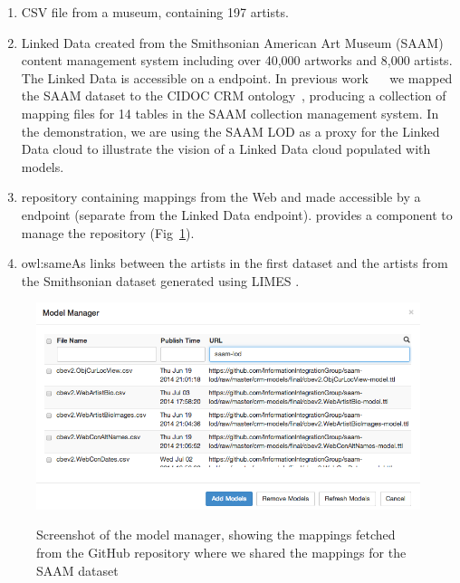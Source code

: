 \begin{enumerate}
\item CSV file from a museum, containing 197 artists. %
\item Linked Data created from the Smithsonian American Art Museum (SAAM) content management system including over 40,000 artworks and 8,000 artists. 
The Linked Data is accessible on a \sparql endpoint.
In previous work~\cite{Szekely:2013vq} ~ we mapped the SAAM dataset to the CIDOC CRM ontology~\cite{Doerr:2003:CCR:958671.958678}, producing a collection of \rtworml mapping files for 14 tables in the SAAM collection management system.
In the demonstration, we are using the SAAM LOD as a proxy for the Linked Data cloud to illustrate the vision of a Linked Data cloud populated with \rtworml models.
\item \rtworml repository containing \rtworml mappings from the Web and made accessible by a \sparql endpoint (separate from the Linked Data endpoint).
\karma provides a component to manage the \rtworml repository (Fig~\ref{fig:model-manager-screenshot}).
\item owl:sameAs links between the artists in the first dataset and the artists from the Smithsonian dataset generated using LIMES \cite{ngomo2011limes}.
\end{enumerate}
\begin{figure}[bth]
\begin{center}
\includegraphics[width=4.8in]{images/3-model-manager.png}
\vspace{-3mm}
\caption{Screenshot of the model manager, showing the \rtworml mappings fetched from the GitHub repository where we shared the mappings for the SAAM dataset}
\vspace{-2mm}
\label{fig:model-manager-screenshot}
\end{center}
\vspace{-1.5em}
\end{figure}